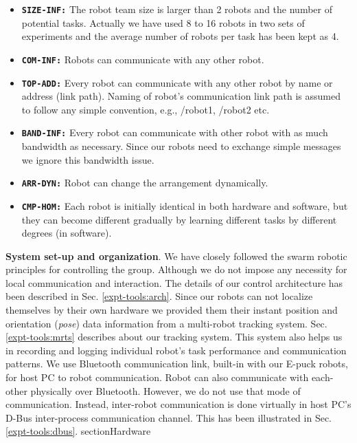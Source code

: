 \begin{itemize}
\item \texttt{\textbf{SIZE-INF:}} The robot team size is larger than 2 robots and the number of potential tasks. Actually we have used  8 to 16 robots in two sets of experiments and  the average number of robots per task has been kept as 4.
\item \texttt{\textbf{COM-INF:}} Robots can communicate with any other robot.
\item \texttt{\textbf{TOP-ADD:}} Every robot can communicate with any other robot by name or address (link path). Naming of robot's communication link path is assumed to follow any simple convention, e.g., /robot1, /robot2 etc.
\item \texttt{\textbf{BAND-INF:}} Every robot can communicate with other robot with as much bandwidth as necessary. Since our robots need to exchange simple messages we ignore this bandwidth issue.
\item \texttt{\textbf{ARR-DYN:}} Robot can change the arrangement dynamically.
\item \texttt{\textbf{CMP-HOM:}} Each robot is initially identical in both hardware and software, but they can become different gradually by learning different tasks by different degrees (in software).
\end{itemize}
\textbf{System set-up and organization}. We have closely followed the swarm robotic principles for controlling the group. Although we do not impose any necessity for local communication and interaction. The details of our control architecture has been described in Sec. \ref{expt-tools:arch}. Since our robots can not localize themselves by their own hardware we provided them their instant position and orientation ({\em pose}) data information from a multi-robot tracking system. Sec. \ref{expt-tools:mrts} describes about our tracking system. This system also helps us in recording and logging individual robot's task performance and communication patterns. We use Bluetooth communication link, built-in with our E-puck robots, for host PC to robot communication. Robot can also communicate with each-other physically over Bluetooth. However, we do not use that mode of communication. Instead, inter-robot communication is done virtually in host PC's D-Bus inter-process communication channel. This has been illustrated in Sec. \ref{expt-tools:dbus}.
section{Hardware}
